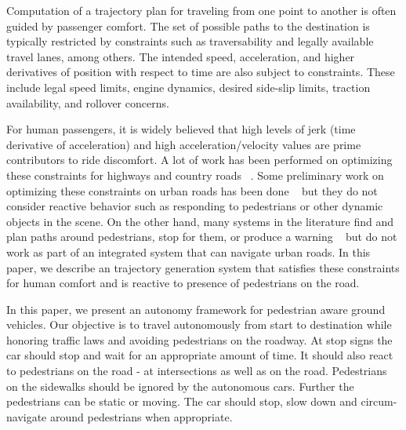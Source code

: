 \documentclass[letterpaper, 10 pt, conference]{ieeeconf}  %
\begin{document}
Computation of a trajectory plan for traveling from one point to another is often guided by
passenger comfort. The set of possible paths to the destination is typically restricted 
by constraints such as traversability and legally available travel lanes, among others.
The intended speed, acceleration, and higher derivatives of position with respect to time are also subject to constraints.
These include legal speed limits, engine dynamics, desired side-slip limits, traction availability, and rollover concerns.

For human passengers, it is widely believed that high levels of jerk (time derivative of acceleration) and high acceleration/velocity values are prime contributors to ride discomfort.
A lot of work has been performed on optimizing these constraints for highways and country roads ~\cite{ziegler14,bahram15,xu12,CHEB15CI}.
Some preliminary work on optimizing these constraints on urban roads has been done ~\cite{Rastelli14,Li15} but they do not consider reactive behavior such as responding to pedestrians or other dynamic objects in the scene.
On the other hand, many systems in the literature find and plan paths around pedestrians, stop for them, or produce a warning ~\cite{pradalier05,benenson06,gu14,mogelmose15,johnson13} but do not work as part of an integrated system that can navigate urban roads.
In this paper, we describe an trajectory generation system that satisfies these constraints for human comfort and is reactive to presence of pedestrians on the road.

In this paper, we present an autonomy framework for pedestrian aware ground vehicles.
Our objective is to travel autonomously from start to destination while honoring traffic laws and avoiding pedestrians on the roadway.
At stop signs the car should stop and wait for an appropriate amount of time.
It should also react to pedestrians on the road - at intersections as well as on the road.
Pedestrians on the sidewalks should be ignored by the autonomous cars.
Further the pedestrians can be static or moving.
The car should stop, slow down and circum-navigate around pedestrians when appropriate.
\end{document}
